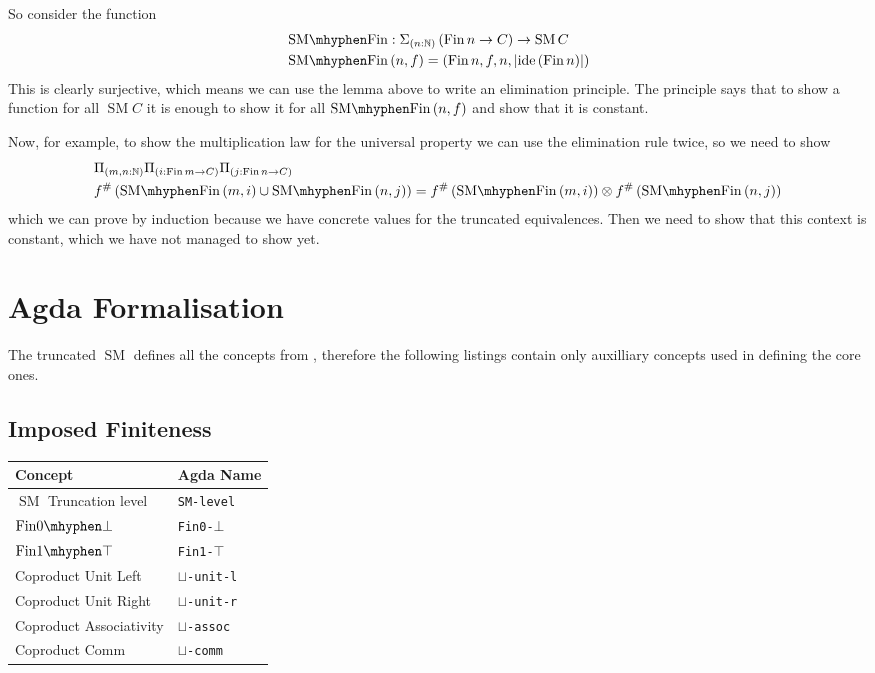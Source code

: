 \documentclass[12pt, parskip, DIV=14]{scrbook}
\newcommand{\SM}{\operatorname{SM}}
\newcommand{\Fin}{\operatorname{Fin}}
\newcommand{\finempty}{\operatorname{Fin0\mhyphen\bot}}
\newcommand{\finunit}{\operatorname{Fin1\mhyphen\top}}
\newcommand{\smfin}{\operatorname{SM\mhyphen Fin}}
\begin{document}
So consider the function
\begin{align*}
  & \smfin : \Sigma_{(n : \mathbb{N})}\,(\Fin n \to C) \to \SM C \\
  & \smfin\,(n , f) = (\Fin n , f , n , | \mathrm{ide}\,(\Fin n) |)
\end{align*}
This is clearly surjective, which means we can use the lemma above to write an elimination principle. The principle says that to show a function for all $\SM C$ it is enough to show it for all $\smfin\,(n , f)$ and show that it is constant.

Now, for example, to show the multiplication law for the universal property we can use the elimination rule twice, so we need to show
\begin{align*}
  &\Pi_{(m , n : \mathbb{N})}\Pi_{(i : \Fin m \to C)}\Pi_{(j : \Fin n \to C)} \\
  &f^\#\,(\smfin\,(m , i) \cup \smfin\,(n , j)) = f^\#\,(\smfin\,(m , i)) \otimes f^\#\,(\smfin\,(n , j))
\end{align*}
which we can prove by induction because we have concrete values for the truncated equivalences. Then we need to show that this context is constant, which we have not managed to show yet.

\section{Agda Formalisation}

The truncated $\SM$ defines all the concepts from , therefore the following listings contain only auxilliary concepts used in defining the core ones.

\subsection{Imposed Finiteness}

\begin{center}
\begin{tabular}{ll}
  Concept & Agda Name \\
  \hline
  $\SM$ Truncation level & \texttt{SM-level} \\
  $\finempty$ & \texttt{Fin0-$\bot$} \\
  $\finunit$ & \texttt{Fin1-$\top$} \\
  Coproduct Unit Left & \texttt{$\sqcup$-unit-l} \\
  Coproduct Unit Right & \texttt{$\sqcup$-unit-r} \\
  Coproduct Associativity & \texttt{$\sqcup$-assoc} \\
  Coproduct Comm & \texttt{$\sqcup$-comm} \\
\end{tabular}
\end{center}
\end{document}
